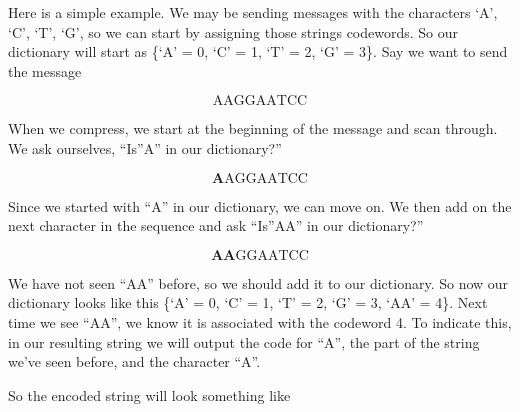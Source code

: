 \documentclass[12pt,twoside]{reedthesis}
\begin{document}
Here is a simple example. We may be sending messages with the characters `A', `C', `T', `G', so we can start by assigning those strings codewords. So our dictionary will start as \{`A' = 0, `C' = 1, `T' = 2, `G' = 3\}. Say we want to send the message

\[\text{AAGGAATCC}\]

When we compress, we start at the beginning of the message and scan through. We ask ourselves, ``Is''A'' in our dictionary?''

\[\textbf{A} \text{AGGAATCC}\]

Since we started with ``A'' in our dictionary, we can move on. We then add on the next character in the sequence and ask ``Is''AA'' in our dictionary?''

\[\textbf{AA} \text{GGAATCC}\]

We have not seen ``AA'' before, so we should add it to our dictionary. So now our dictionary looks like this \{`A' = 0, `C' = 1, `T' = 2, `G' = 3, `AA' = 4\}. Next time we see ``AA'', we know it is associated with the codeword 4. To indicate this, in our resulting string we will output the code for ``A'', the part of the string we've seen before, and the character ``A''.

So the encoded string will look something like
\end{document}
